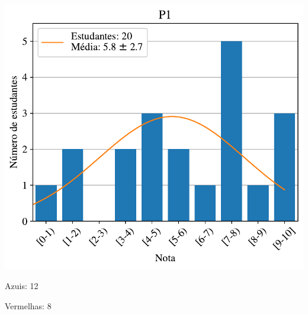 \documentclass[12pt]{article}
\begin{document}
\begin{multicols}{2}
\begin{tabular}{lccc}
\hline 
\end{tabular} 

\includegraphics[width=\columnwidth]{hist-P1.pdf}
\begin{minipage}{\columnwidth}
\begin{flushright}
Azuis: 12

Vermelhas: 8 
\end{flushright}
\vskip 5mm
\end{minipage}
\end{multicols}
\end{document}
